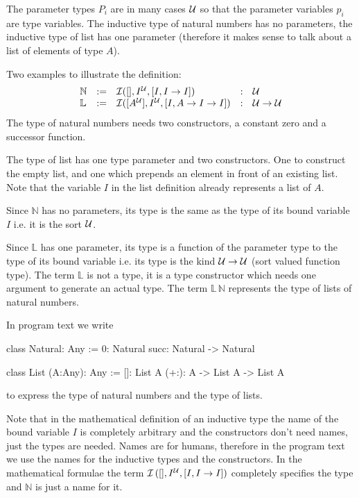 \begin{description}
  The parameter types $P_i$ are in many cases ${\cal{U}}$ so that the parameter
  variables $p_i$ are type variables. The inductive type of natural numbers has
  no parameters, the inductive type of list has one parameter (therefore it
  makes sense to talk about a list of elements of type $A$).

  Two examples to illustrate the definition:
  $$
  \begin{array}{lllll}
    \mathbb{N}
    &:=& {\cal I } ([], I^{\cal{U}}, [I, I \to I])
    &:& {\cal{U}}
    \\
    \mathbb{L}
    &:=& {\cal I } ([A^{\cal{U}}],  I^{{\cal{U}}},  [I, A \to I \to I])
    &:& {\cal{U}} \to {\cal{U}}
  \end{array}
  $$
  The type of natural numbers needs two constructors, a constant zero and a
  successor function.

  The type of list has one type parameter and two constructors. One to
  construct the empty list, and one which prepends an element in front of an
  existing list. Note that the variable $I$ in the list definition already
  represents a list of $A$.

  Since $\mathbb{N}$ has no parameters, its type is the same as the type of
  its bound variable $I$ i.e. it is the sort ${\cal{U}}$.

  Since $\mathbb{L}$ has one parameter, its type is a function of the
  parameter type to the type of its bound variable i.e. its type is the kind
  ${\cal{U}} \to {\cal{U}}$ (sort valued function type). The term $\mathbb{L}$ is not a
  type, it is a type constructor which needs one argument to generate an
  actual type. The term $\mathbb{L} \, \mathbb{N}$ represents the type of
  lists of natural numbers.

  In program text we write
  \begin{alba}
      class Natural: Any
      :=
            0: Natural
            succ: Natural -> Natural

      class List (A:Any): Any :=
            []: List A
            (+:): A -> List A -> List A
  \end{alba}
  to express the type of natural numbers and the type of lists.

  Note that in the mathematical definition of an inductive type the name of
  the bound variable $I$ is completely arbitrary and the constructors don't
  need names, just the types are needed. Names are for humans, therefore in
  the program text we use the names for the inductive types and the
  constructors. In the mathematical formulae the term
  ${\cal I }\, ([], I^{\cal{U}}, [I, I \to I])$ completely specifies the type and
  $\mathbb{N}$ is just a name for it.


\end{description}
